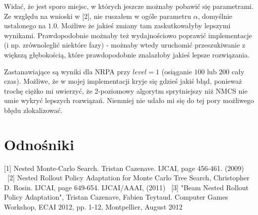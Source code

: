 \documentclass[a4paper,10pt]{article}
\begin{document}
Widać, że jest sporo miejsc, w których jeszcze możnaby pobawić się parametrami. Ze względu na wnioski w [2], nie ruszałem w ogóle parametru 
$\alpha$, domyślnie ustalonego na $1.0$. Możliwe że jakieś zmiany tam zaskutkowałyby lepszymi wynikami. Prawdopodobnie możnaby też wydajnościowo
poprawić implementacje (i np. zrównoleglić niektóre fazy) - możnaby wtedy uruchomić przeszukiwanie z większą głębokością, które prawdopodobnie
znalazłoby jakieś lepsze rozwiązania.

Zastanawiające są wyniki dla NRPA przy $level=1$ (osiąganie $100$ lub $200$ cały czas). Możliwe, że w mojej implementacji kryje się gdzieś jakiś
błąd, ponieważ trochę ciężko mi uwierzyć, że 2-poziomowy algorytm sprytniejszy niż NMCS nie umie wykryć lepszych rozwiązań. Niemniej nie udało mi
się do tej pory możliwego błędu zlokalizować.

\section{Odnośniki}
[1] Nested Monte-Carlo Search.
Tristan Cazenave. IJCAI, page 456-461. (2009) \
[2] Nested Rollout Policy Adaptation for Monte Carlo Tree Search,
Christopher D. Rosin. IJCAI, page 649-654. IJCAI/AAAI, (2011) \
[3] "Beam Nested Rollout Policy Adaptation", Tristan Cazenave,
Fabien Teytaud. Computer Games Workshop, ECAI 2012, pp. 1-12, Montpellier, August 2012
\end{document}
